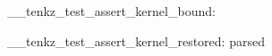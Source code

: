 \documentclass{standalone}
\begin{document}
\begingroup
  \tenkzkernel
  \ExplSyntaxOn
  \__tenkz_test_assert_kernel_bound:
  \ExplSyntaxOff
  \begin{tenkz}[rows={ket}, cols=1]
  \end{tenkz}
\endgroup
\ExplSyntaxOn
\__tenkz_test_assert_kernel_restored:
\ExplSyntaxOff
\mbox{parsed}
\end{document}
